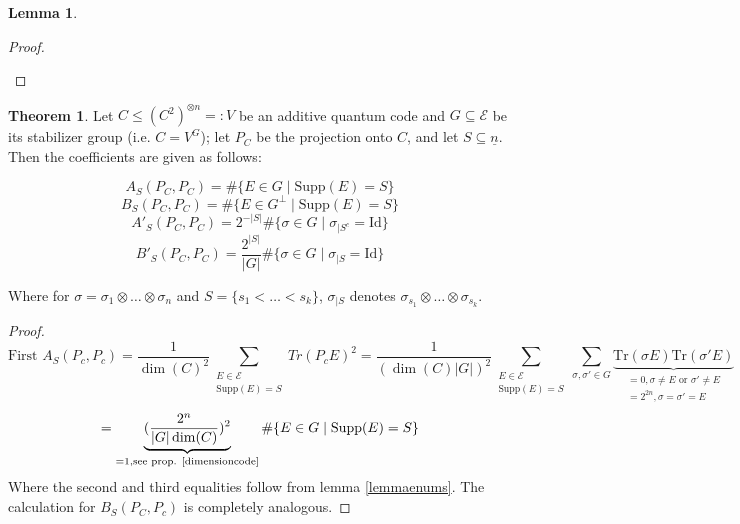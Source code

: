 \documentclass{article}
\def\supp{\text{Supp}}
\def\n{\underline{n}}
\def\Tr{\text{Tr}}
\def\Id{\text{Id}}
\newenvironment{bew}{\begin{proof}[Proof]}{\end{proof}}
\theoremstyle{definition}
\newtheorem{theorem}[Satz]{Theorem}
\newtheorem{lem}[Satz]{Lemma}
\begin{document}
\begin{lem}
\begin{bew}
\begin{enumerate}
\end{enumerate}
\end{bew}
\end{lem}

\begin{theorem}
Let $C \leq (C^2)^{\otimes n} =: V$ be an additive quantum code and $G \subseteq \mathcal{E}$ be its stabilizer group (i.e. $C = V^G$); let $P_C$ be the projection onto $C$, and let $S \subseteq \n$. Then the coefficients are given as follows:

\begin{equation} A_S(P_C,P_C) = \# \{ E \in G \mid \supp(E) = S \} \end{equation}
\begin{equation} B_S(P_C,P_C) = \# \{ E \in G^\perp \mid \supp(E) = S \} \end{equation}
\begin{equation} A'_S(P_C,P_C) = 2^{-|S|} \# \{ \sigma \in G \mid \sigma_{\big| S^c} = \Id \} \end{equation}
\begin{equation} B'_S(P_C,P_C) = \frac{2^{|S|}}{|G|} \# \{ \sigma \in G \mid \sigma_{\big| S} = \Id \} \end{equation}

Where for $ \sigma = \sigma_1 \otimes \ldots \otimes \sigma_n$ and $S = \{ s_1 < \ldots < s_k \}$, $\sigma_{\big| S}$ denotes $\sigma_{s_1} \otimes \ldots \otimes \sigma_{s_k}$.

\begin{proof}
\begin{equation} \text{First } A_S(P_c,P_c) = \frac{1}{\dim(C)^2} \sum_{\substack{E \in \mathcal{E} \\ \supp(E) = S}} Tr(P_c E)^2 = \frac{1}{(\dim(C)|G|)^2} \sum_{\substack{E \in \mathcal{E} \\ \supp(E) = S}} \sum_{\sigma,\sigma' \in G} \underbrace{ \Tr(\sigma E) \Tr(\sigma' E)}_{\substack{=0, \sigma \neq E \text{ or } \sigma' \neq E \\ =2^{2n}, \sigma = \sigma' = E}} \end{equation}
\begin{equation} = \underbrace{(\frac{2^n}{ |G| \dim (C)})^2 }_{ = 1, \text{see prop. \ref{dimensioncode}}} \# \{ E \in G \mid \supp(E) = S \} \end{equation}
Where the second and third equalities follow from lemma \ref{lemmaenums}. The calculation for $B_S(P_C,P_c)$ is completely analogous.


\end{proof}
\end{theorem}
\end{document}
